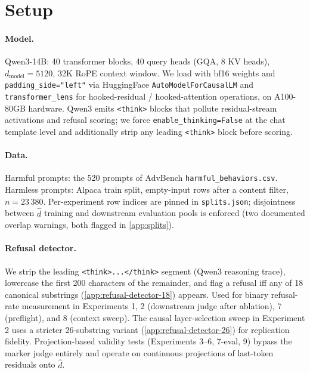 \documentclass[10pt,twocolumn]{article}
\newcommand{\dhat}{\hat{d}}
\newcommand{\model}{Qwen3-14B}
\newcommand{\advbench}{AdvBench}
\newcommand{\alpaca}{Alpaca}
\theoremstyle{definition}
\begin{document}
\section{Setup}
\label{sec:setup}

\paragraph{Model.}
\model{}: 40 transformer blocks, 40 query heads (GQA, 8 KV heads),
$d_\mathrm{model}{=}5120$, 32K RoPE context window. We load with bf16
weights and \texttt{padding\_side="left"} via HuggingFace
\texttt{AutoModelForCausalLM} and \texttt{transformer\_lens}
\citep{nanda2022transformerlens} for hooked-residual /
hooked-attention operations, on A100-80GB hardware. Qwen3 emits
\texttt{<think>} blocks that pollute residual-stream activations and
refusal scoring; we force \texttt{enable\_thinking=False} at the chat
template level and additionally strip any leading \texttt{<think>}
block before scoring.

\paragraph{Data.}
Harmful prompts: the 520 prompts of \advbench{} \citep{zou2023advbench} \texttt{harmful\_behaviors.csv}. Harmless prompts: \alpaca{} \citep{taori2023alpaca} train split, empty-input rows after a content filter, $n{=}23\,380$. Per-experiment row indices are pinned in \texttt{splits.json}; disjointness between $\dhat$ training and downstream evaluation pools is enforced (two documented overlap warnings, both flagged in \cref{app:splits}).

\paragraph{Refusal detector.}
We strip the leading \texttt{<think>...</think>} segment (Qwen3 reasoning
trace), lowercase the first 200 characters of the remainder, and flag a
refusal iff any of 18 canonical substrings (\cref{app:refusal-detector-18})
appears. Used for binary refusal-rate measurement in Experiments 1, 2
(downstream judge after ablation), 7 (preflight), and 8 (context sweep).
The causal layer-selection sweep in Experiment 2 uses a stricter
26-substring variant (\cref{app:refusal-detector-26}) for replication
fidelity. Projection-based validity tests (Experiments
3--6, 7-eval, 9) bypass the marker judge entirely and operate on
continuous projections of last-token residuals onto $\dhat$.
\end{document}

